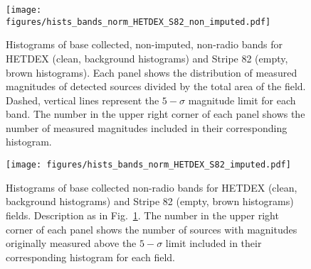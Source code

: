 \documentclass{aa}
\begin{document}
\begin{figure}
  \centering
  \texttt{[image: figures/hists\_bands\_norm\_HETDEX\_S82\_non\_imputed.pdf]}
  \caption{Histograms of base collected, non-imputed, non-radio bands for HETDEX (clean, background histograms) and Stripe 82 (empty, brown histograms). Each panel shows the distribution of measured magnitudes of detected sources divided by the total area of the field. Dashed, vertical lines represent the $5{-}\sigma$ magnitude limit for each band. The number in the upper right corner of each panel shows the number of measured magnitudes included in their corresponding histogram.}
  \label{fig:hists_bands_nonimp_HETDEX_S82}
\end{figure}

\begin{figure}
   \centering
   \texttt{[image: figures/hists\_bands\_norm\_HETDEX\_S82\_imputed.pdf]}
   \caption{Histograms of base collected non-radio bands for HETDEX (clean, background histograms) and Stripe 82 (empty, brown histograms) fields. Description as in Fig.~\ref{fig:hists_bands_nonimp_HETDEX_S82}. The number in the upper right corner of each panel shows the number of sources with magnitudes originally measured above the $5{-}\sigma$ limit included in their corresponding histogram for each field.}
   \label{fig:hists_bands_HETDEX_S82}
\end{figure}

\begin{table}
\setlength{\tabcolsep}{2pt}
\caption{Bands available for model training in our dataset}             %
\label{table:used_bands}      %
\centering                          %
\end{table}
\end{document}
